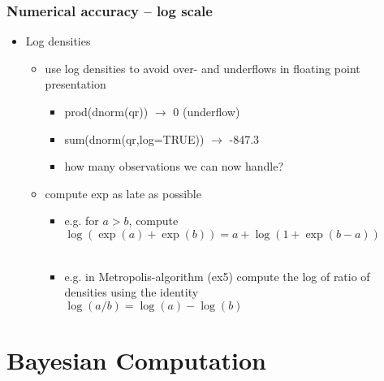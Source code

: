 \documentclass[10pt]{beamer}
\begin{document}
\begin{frame}

\frametitle{Numerical accuracy -- log scale}

  \begin{itemize}
  \item Log densities
    \begin{itemize}
    \item use log densities to avoid over- and underflows in floating
      point presentation
      \begin{itemize}
      \item {\color{uured} prod(dnorm(qr)) $\rightarrow$} {\color{red} 0 (underflow)}
      \item {\color{uured} sum(dnorm(qr,log=TRUE)) $\rightarrow$} {\color{uured} -847.3}
      \item<2-> how many observations we can now handle? %
    \end{itemize}
    \item<3-> compute exp as late as possible
      \begin{itemize}
      \item<4-> e.g. for $a>b$, compute $\log(\exp(a)+\exp(b)) = a + \log(1+\exp(b-a))$\\
        \\
      \item<7-> e.g. in Metropolis-algorithm (ex5) compute the log of ratio of densities using the identity\\
        $\log(a/b)=\log(a)-\log(b)$
    \end{itemize}
    \end{itemize}
  \end{itemize}

\end{frame}

\section{Bayesian Computation}
\frame{\sectionpage}
\end{document}
